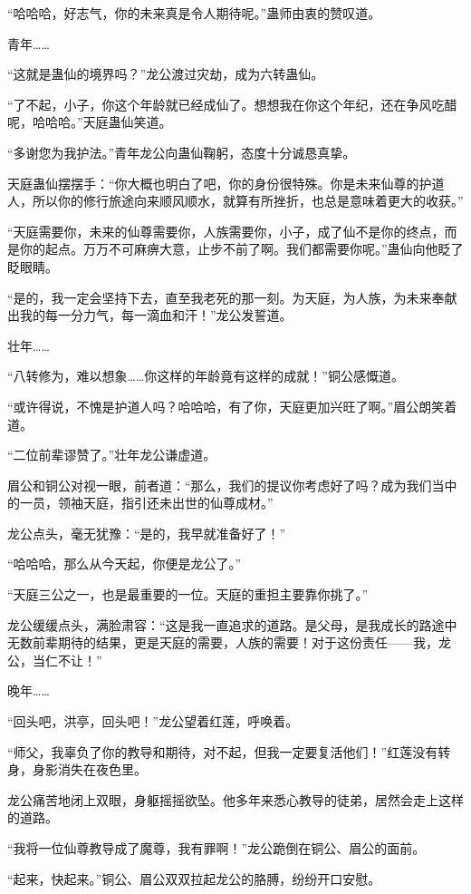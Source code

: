 \begin{this_body}
“哈哈哈，好志气，你的未来真是令人期待呢。”蛊师由衷的赞叹道。

青年……

“这就是蛊仙的境界吗？”龙公渡过灾劫，成为六转蛊仙。

“了不起，小子，你这个年龄就已经成仙了。想想我在你这个年纪，还在争风吃醋呢，哈哈哈。”天庭蛊仙笑道。

“多谢您为我护法。”青年龙公向蛊仙鞠躬，态度十分诚恳真挚。

天庭蛊仙摆摆手：“你大概也明白了吧，你的身份很特殊。你是未来仙尊的护道人，所以你的修行旅途向来顺风顺水，就算有所挫折，也总是意味着更大的收获。”

“天庭需要你，未来的仙尊需要你，人族需要你，小子，成了仙不是你的终点，而是你的起点。万万不可麻痹大意，止步不前了啊。我们都需要你呢。”蛊仙向他眨了眨眼睛。

“是的，我一定会坚持下去，直至我老死的那一刻。为天庭，为人族，为未来奉献出我的每一分力气，每一滴血和汗！”龙公发誓道。

壮年……

“八转修为，难以想象……你这样的年龄竟有这样的成就！”铜公感慨道。

“或许得说，不愧是护道人吗？哈哈哈，有了你，天庭更加兴旺了啊。”眉公朗笑着道。

“二位前辈谬赞了。”壮年龙公谦虚道。

眉公和铜公对视一眼，前者道：“那么，我们的提议你考虑好了吗？成为我们当中的一员，领袖天庭，指引还未出世的仙尊成材。”

龙公点头，毫无犹豫：“是的，我早就准备好了！”

“哈哈哈，那么从今天起，你便是龙公了。”

“天庭三公之一，也是最重要的一位。天庭的重担主要靠你挑了。”

龙公缓缓点头，满脸肃容：“这是我一直追求的道路。是父母，是我成长的路途中无数前辈期待的结果，更是天庭的需要，人族的需要！对于这份责任——我，龙公，当仁不让！”

晚年……

“回头吧，洪亭，回头吧！”龙公望着红莲，呼唤着。

“师父，我辜负了你的教导和期待，对不起，但我一定要复活他们！”红莲没有转身，身影消失在夜色里。

龙公痛苦地闭上双眼，身躯摇摇欲坠。他多年来悉心教导的徒弟，居然会走上这样的道路。

“我将一位仙尊教导成了魔尊，我有罪啊！”龙公跪倒在铜公、眉公的面前。

“起来，快起来。”铜公、眉公双双拉起龙公的胳膊，纷纷开口安慰。


\end{this_body}
